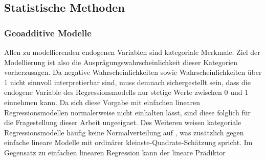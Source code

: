 \documentclass{Vorlage}
\begin{document}
\begin{table}[h]
\centering
\caption{Erhobene sozioökonomische und geographische Variablen der Gebäude- und Wohnungszählung im Rahmen des Zensus und deren Anzahl der Ausprägungen.}
\label{Var_Zensus}
\end{table}


\subsection{Statistische Methoden}

\subsubsection{Geoadditive Modelle}
Allen zu modellierenden endogenen Variablen sind kategoriale Merkmale. Ziel der Modellierung ist also  die Ausprägungswahrscheinlichkeit dieser Kategorien vorherzusagen. Da negative Wahrscheinlichkeiten sowie Wahrscheinlichkeiten über 1 nicht sinnvoll interpretierbar sind, muss demnach sichergestellt sein, dass die endogene Variable des Regressionsmodells nur stetige Werte zwischen 0 und 1 einnehmen kann. Da sich diese Vorgabe mit einfachen linearen Regressionsmodellen normalerweise nicht einhalten lässt, sind diese folglich für die Fragestellung dieser Arbeit ungeeignet. Des Weiteren weisen kategoriale Regressionsmodelle häufig keine Normalverteilung auf \cite[p. 277]{fahrmeir2013regression}, was zusätzlich gegen einfache lineare Modelle mit ordinärer kleinste-Quadrate-Schätzung spricht. Im Gegensatz zu einfachen linearen Regression kann der lineare Prädiktor
\end{document}
